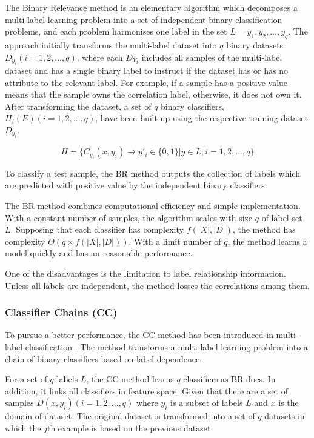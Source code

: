 The Binary Relevance method is an elementary algorithm which decomposes a multi-label learning problem into a set of independent binary classification problems, and each problem harmonises one label in the set $L = {y_{1}, y_{2},...,y_{q}}$. The approach initially transforms the multi-label dataset into $q$ binary datasets $D_{y_{i}} (i = 1,2,...,q)$, where each $D_{Y_{I}}$ includes all samples of the multi-label dataset and has a single binary label to instruct if the dataset has or has no attribute to the relevant label. For example, if a sample has a positive value means that the sample owns the correlation label, otherwise, it does not own it. After transforming the dataset, a set of $q$ binary classifiers, $H_{i}(E) (i = 1,2,...,q)$, have been built up using the respective training dataset $D_{y_{i}}$. 

\begin{equation}\label{eq:BinaryRelevance}
H = \{C_{y_{i}}(x, y_{i}) \to y'_{i} \in \{0,1\}| y \in L, i = 1,2,...,q\}
\end{equation}

To classify a test sample, the BR method outputs the collection of labels which are predicted with positive value by the independent binary classifiers.

The BR method combines computational efficiency and simple implementation. With a constant number of samples, the algorithm scales with size $q$ of label set $L$. Supposing that each classifier has complexity $f(|X|,|D|)$, the method has complexity $O(q \times f(|X|,|D|))$. With a limit number of $q$, the method learns a model quickly and has an reasonable performance.

One of the disadvantages is the limitation to label relationship information. Unless all labels are independent, the method losses the correlations among them.

\subsubsection{Classifier Chains (CC)}

To pursue a better performance, the CC method has been introduced in multi-label classification \citep{read2011classifier}. The method transforms a multi-label learning problem into a chain of binary classifiers based on label dependence.

For a set of $q$ labels $L$, the CC method learns $q$ classifiers as BR does. In addition, it links all classifiers in feature space. Given that there are a set of samples $D(x,y_{i}) (i = 1,2,...,q)$ where $y_{i}$ is a subset of labels $L$ and $x$ is the domain of dataset. The original dataset is transformed into a set of $q$ datasets in which the $j$th example is based on the previous dataset.

